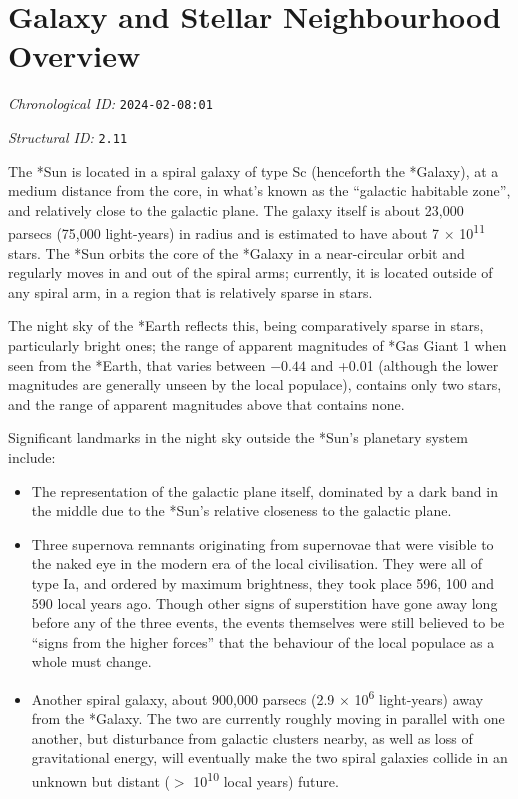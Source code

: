 \section{Galaxy and Stellar Neighbourhood Overview}
\emph{Chronological ID:} \texttt{2024-02-08:01}

\emph{Structural ID:} \texttt{2.11}

The *Sun is located in a spiral galaxy of type Sc (henceforth the *Galaxy), at a medium distance from the core, in what's known as the ``galactic habitable zone'', and relatively close to the galactic plane. The galaxy itself is about 23,000 parsecs (75,000 light-years) in radius and is estimated to have about 7 $\times$ 10\textsuperscript{11} stars. The *Sun orbits the core of the *Galaxy in a near-circular orbit and regularly moves in and out of the spiral arms; currently, it is located outside of any spiral arm, in a region that is relatively sparse in stars.

The night sky of the *Earth reflects this, being comparatively sparse in stars, particularly bright ones; the range of apparent magnitudes of *Gas Giant 1 when seen from the *Earth, that varies between $-0.44$ and +0.01 (although the lower magnitudes are generally unseen by the local populace), contains only two stars, and the range of apparent magnitudes above that contains none.

Significant landmarks in the night sky outside the *Sun's planetary system include:

\begin{itemize}
  \item The representation of the galactic plane itself, dominated by a dark band in the middle due to the *Sun's relative closeness to the galactic plane.
  \item Three supernova remnants originating from supernovae that were visible to the naked eye in the modern era of the local civilisation. They were all of type Ia, and ordered by maximum brightness, they took place 596, 100 and 590 local years ago. Though other signs of superstition have gone away long before any of the three events, the events themselves were still believed to be ``signs from the higher forces'' that the behaviour of the local populace as a whole must change.
  \item Another spiral galaxy, about 900,000 parsecs (2.9 $\times$ 10\textsuperscript{6} light-years) away from the *Galaxy. The two are currently roughly moving in parallel with one another, but disturbance from galactic clusters nearby, as well as loss of gravitational energy, will eventually make the two spiral galaxies collide in an unknown but distant ($>$ 10\textsuperscript{10} local years) future.
\end{itemize}
\newpage
